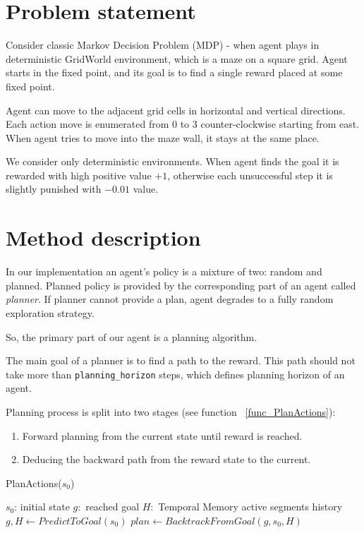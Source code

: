 \documentclass[runningheads]{llncs}
\begin{document}
\section{Problem statement}

Consider classic Markov Decision Problem (MDP) - when agent plays in deterministic GridWorld environment, which is a maze on a square grid. Agent starts in the fixed point, and its goal is to find a single reward placed at some fixed point.

Agent can move to the adjacent grid cells in horizontal and vertical directions. Each action move is enumerated from 0 to 3 counter-clockwise starting from east. When agent tries to move into the maze wall, it stays at the same place.

We consider only deterministic environments. When agent finds the goal it is rewarded with high positive value $+1$, otherwise each unsuccessful step it is slightly punished with $-0.01$ value.

\section{Method description}
In our implementation an agent's policy is a mixture of two: random and planned. Planned policy is provided by the corresponding part of an agent called \textit{planner}. If planner cannot provide a plan, agent degrades to a fully random exploration strategy.

So, the primary part of our agent is a planning algorithm.

The main goal of a planner is to find a path to the reward. This path should not take more than \verb|planning_horizon| steps, which defines planning horizon of an agent.

Planning process is split into two stages (see function ~\ref{func_PlanActions}):

\begin{enumerate}
  \item Forward planning from the current state until reward is reached.
  \item Deducing the backward path from the reward state to the current.
\end{enumerate}

\begin{function}
  \caption{PlanActions($s_0$)}\label{func_PlanActions}
  \SetAlgoNoLine
  $s_0$: initial state \;
  $g: $ reached goal \;
  $H: $ Temporal Memory active segments history \;
  \quad \\

  $g, H \leftarrow PredictToGoal(s_0)$ \;
  $plan \leftarrow BacktrackFromGoal(g, s_0, H)$ \;

\end{function}
\end{document}
